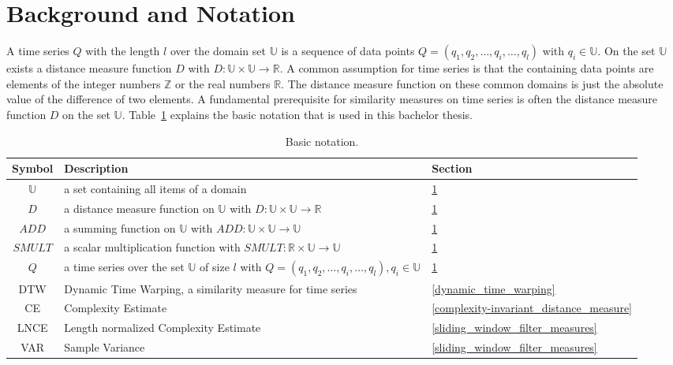 \section{Background and Notation} \label{background_and_notation}
A time series $Q$ with the length $l$ over the domain set $\mathbb{U}$ is a sequence of data points
$Q = (q_1, q_2, \dots, q_i, \dots, q_l)$ with $q_i \in \mathbb{U}$. On the set $\mathbb{U}$ exists a distance measure
function $D$ with $D: \mathbb{U} \times \mathbb{U} \to \mathbb{R}$. A common assumption for time series is that the
containing data points are elements of the integer numbers $\mathbb{Z}$ or the real numbers $\mathbb{R}$. The distance
measure function on these common domains is just the absolute value of the difference of two elements. A fundamental
prerequisite for similarity measures on time series is often the distance measure function $D$ on the set
$\mathbb{U}$. Table~\ref{tab:notation} explains the basic notation that is used in this bachelor thesis.

\begin{table}
    \begin{center}
        \begin{tabularx}{\textwidth}{c X l}
            \textbf{Symbol} \qquad & \textbf{Description} & \qquad \textbf{Section}\\
            \hline
            $\mathbb{U}$ & a set containing all items of a domain & \qquad \ref{background_and_notation}\\
            $D$ & a distance measure function on $\mathbb{U}$ with $D: \mathbb{U} \times \mathbb{U} \to \mathbb{R}$
                & \qquad \ref{background_and_notation}\\
            $ADD$ & a summing function on $\mathbb{U}$ with $ADD: \mathbb{U} \times \mathbb{U} \to \mathbb{U}$
                & \qquad \ref{background_and_notation}\\
            $SMULT$ & a scalar multiplication function with $SMULT: \mathbb{R} \times \mathbb{U} \to \mathbb{U}$
                & \qquad \ref{background_and_notation}\\
            $Q$ & a time series over the set $\mathbb{U}$ of size $l$ with
                $Q = (q_1, q_2, \dots, q_i, \dots, q_l), q_i \in \mathbb{U}$ & \qquad \ref{background_and_notation}\\
            DTW & Dynamic Time Warping, a similarity measure for time series & \qquad \ref{dynamic_time_warping}\\
            CE & Complexity Estimate & \qquad \ref{complexity-invariant_distance_measure}\\
            LNCE & Length normalized Complexity Estimate & \qquad \ref{sliding_window_filter_measures}\\
            VAR & Sample Variance & \qquad \ref{sliding_window_filter_measures}\\
        \end{tabularx}
    \end{center}
    \caption{Basic notation.}
	\label{tab:notation}
\end{table}



